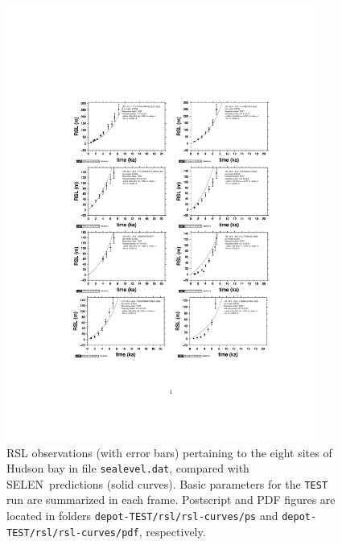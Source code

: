 \documentclass[11pt,fleqn,a4paper,titlepage]{article}
\newcommand\selen{\textsf{SELEN~}}
\begin{document}
\begin{figure}[h]
\begin{center}
\vspace{0.6cm}
\includegraphics[width=0.9\textwidth,angle=0]{./Figures/rsl-1.pdf}
\caption[Hudson bay RSL curves]{\small{RSL observations (with error bars) pertaining to the eight sites of Hudson bay in file \texttt{sealevel.dat}, compared with \selen predictions (solid curves). Basic parameters 
for the \texttt{TEST} run are summarized in each frame. Postscript and PDF figures are located  
in folders \texttt{depot-TEST/rsl/rsl-curves/ps} and \texttt{depot-TEST/rsl/rsl-curves/pdf}, respectively.}}
\label{fig:rsl-1}
\end{center}
\end{figure}
\newpage
\end{document}

